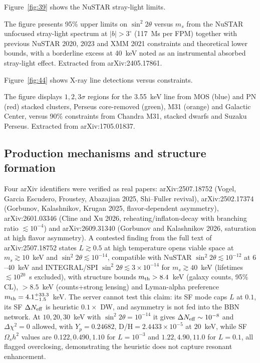 \documentclass[11pt,a4paper]{article}
\begin{document}
Figure~\ref{fig:39} shows the NuSTAR stray-light limits.






The figure presents 95\% upper limits on $\sin^{2}2\theta$ versus $m_{s}$ from the NuSTAR unfocused stray-light spectrum at $|b|>3^{\circ}$ (117~Ms per FPM) together with previous NuSTAR 2020, 2023 and XMM 2021 constraints and theoretical lower bounds, with a borderline excess at 40~keV noted as an instrumental absorbed stray-light effect. Extracted from arXiv:2405.17861.

Figure~\ref{fig:44} shows X-ray line detections versus constraints.






The figure displays $1,2,3\sigma$ regions for the 3.55~keV line from MOS (blue) and PN (red) stacked clusters, Perseus core-removed (green), M31 (orange) and Galactic Center, versus 90\% constraints from Chandra M31, stacked dwarfs and Suzaku Perseus. Extracted from arXiv:1705.01837.

\subsection{Production mechanisms and structure formation}
Four arXiv identifiers were verified as real papers: arXiv:2507.18752 (Vogel, Garcia Escudero, Froustey, Abazajian 2025, Shi--Fuller revival), arXiv:2502.17374 (Gorbunov, Kalashnikov, Krugan 2025, flavor-dependent asymmetry), arXiv:2601.03346 (Cline and Xu 2026, reheating/inflaton-decay with branching ratio $\lesssim10^{-4}$) and arXiv:2609.31340 (Gorbunov and Kalashnikov 2026, saturation at high flavor asymmetry). A contested finding from the full text of arXiv:2507.18752 states $L\gtrsim0.5$ at high temperature opens viable space at $m_{s}\gtrsim10$~keV and $\sin^{2}2\theta\lesssim10^{-14}$, compatible with NuSTAR $\sin^{2}2\theta\lesssim10^{-12}$ at $6$--40~keV and INTEGRAL/SPI $\sin^{2}2\theta\lesssim3\times10^{-14}$ for $m_{s}\gtrsim40$~keV (lifetimes $\lesssim10^{20}$~s excluded), with structure bounds $m_{\rm th}>8.4$~keV (galaxy counts, 95\% CL), $>8.5$~keV (counts+strong lensing) and Lyman-alpha preference $m_{\rm th}=4.1^{+33.3}_{-1.5}$~keV. The server cannot test this claim: its SF mode caps $L$ at $0.1$, its SF $\Delta N_{\rm eff}$ is heuristic $0.1\times$ DW, and asymmetry is not fed into the BBN network. At $10,20,30$~keV with $\sin^{2}2\theta=10^{-14}$ it gives $\Delta N_{\rm eff}\sim10^{-8}$ and $\Delta\chi^{2}=0$ allowed, with $Y_{p}=0.24682$, D/H$=2.4433\times10^{-5}$ at $20$~keV, while SF $\Omega_{s}h^{2}$ values are $0.122,0.490,1.10$ for $L=10^{-3}$ and $1.22,4.90,11.0$ for $L=0.1$, all flagged overclosing, demonstrating the heuristic does not capture resonant enhancement.
\end{document}
